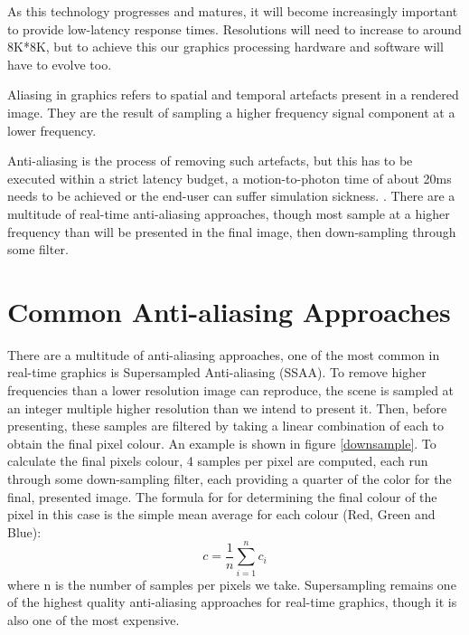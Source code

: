 \documentclass[12pt,a4paper,twoside,openright]{report}
\begin{document}
As this technology progresses and matures, it will become increasingly important to provide low-latency response times. Resolutions will need to increase to around 8K*8K\cite{abrash}, but to achieve this our graphics processing hardware and software will have to evolve too.

Aliasing in graphics refers to spatial and temporal artefacts present in a rendered image. They are the result of sampling a higher frequency signal component at a lower frequency.

Anti-aliasing is the process of removing such artefacts, but this has to be executed within a strict latency budget, a motion-to-photon time of about 20ms needs to be achieved or the end-user can suffer simulation sickness. \cite{MotionToPhoton}.
There are a multitude of real-time anti-aliasing approaches, though most sample at a higher frequency than will be presented in the final image, then down-sampling through some filter. 

\section{Common Anti-aliasing Approaches}\label{supersampling}

There are a multitude of anti-aliasing approaches, one of the most common in real-time graphics is Supersampled Anti-aliasing (SSAA). To remove higher frequencies than a lower resolution image can reproduce, the scene is sampled at an integer multiple higher resolution than we intend to present it.
Then, before presenting, these samples are filtered by taking a linear combination of each to obtain the final pixel colour. An example is shown in figure \ref{downsample}. To calculate the final pixels colour, 4 samples per pixel are computed, each run through some down-sampling filter, each providing a quarter of the color for the final, presented image. The formula for for determining the final colour of the pixel in this case is the simple mean average for each colour (Red, Green and Blue):
$$ c = \frac{1}{n}\displaystyle\sum_{i=1}^n c_i $$ where n is the number of samples per pixels we take. Supersampling remains one of the highest quality anti-aliasing approaches for real-time graphics, though it is also one of the most expensive. 
\end{document}
